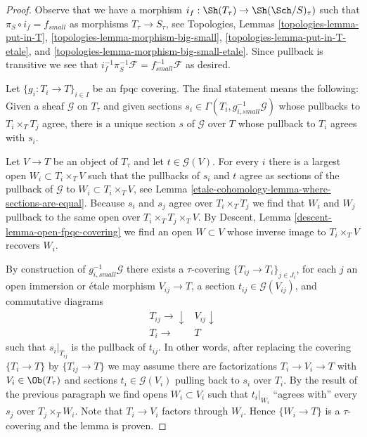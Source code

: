 \begin{proof}
Observe that we have a morphism $i_f : \Sh(T_\tau) \to \Sh(\Sch/S)_\tau)$
such that $\pi_S \circ i_f = f_{small}$ as morphisms
$T_\tau \to S_\tau$, see
Topologies, Lemmas \ref{topologies-lemma-put-in-T},
\ref{topologies-lemma-morphism-big-small},
\ref{topologies-lemma-put-in-T-etale}, and
\ref{topologies-lemma-morphism-big-small-etale}.
Since pullback is transitive we see that
$i_f^{-1} \pi_S^{-1}\mathcal{F} = f_{small}^{-1}\mathcal{F}$ as desired.

\medskip\noindent
Let $\{g_i : T_i \to T\}_{i \in I}$ be an fpqc covering.
The final statement means the following: Given a sheaf $\mathcal{G}$
on $T_\tau$ and given sections
$s_i \in \Gamma(T_i, g_{i, small}^{-1}\mathcal{G})$ whose pullbacks
to $T_i \times_T T_j$ agree, there is a unique section $s$ of $\mathcal{G}$
over $T$ whose pullback to $T_i$ agrees with $s_i$.

\medskip\noindent
Let $V \to T$ be an object of $T_\tau$ and let $t \in \mathcal{G}(V)$.
For every $i$ there is a largest open $W_i \subset T_i \times_T V$
such that the pullbacks of $s_i$ and $t$ agree as sections of the pullback
of $\mathcal{G}$ to $W_i \subset T_i \times_T V$, see
Lemma \ref{etale-cohomology-lemma-where-sections-are-equal}.
Because $s_i$ and $s_j$ agree over $T_i \times_T T_j$ we find
that $W_i$ and $W_j$ pullback to the same open over
$T_i \times_T T_j \times_T V$. By
Descent, Lemma \ref{descent-lemma-open-fpqc-covering}
we find an open $W \subset V$ whose inverse image to $T_i \times_T V$
recovers $W_i$.

\medskip\noindent
By construction of $g_{i, small}^{-1}\mathcal{G}$ there exists
a $\tau$-covering $\{T_{ij} \to T_i\}_{j \in J_i}$, for each $j$ an
open immersion or \'etale morphism $V_{ij} \to T$, a section
$t_{ij} \in \mathcal{G}(V_{ij})$, and commutative diagrams
$$
\begin{array}{cc}T_{ij} \longrightarrow\downarrow & V_{ij} \downarrow \\ T_i \longrightarrow & T\end{array}
$$
such that $s_i|_{T_{ij}}$ is the pullback of $t_{ij}$. In other words,
after replacing the covering $\{T_i \to T\}$ by $\{T_{ij} \to T\}$
we may assume there are factorizations $T_i \to V_i \to T$ with
$V_i \in \Ob(T_\tau)$ and sections $t_i \in \mathcal{G}(V_i)$
pulling back to $s_i$ over $T_i$.
By the result of the previous paragraph we find opens $W_i \subset V_i$
such that $t_i|_{W_i}$ ``agrees with'' every $s_j$ over $T_j \times_T W_i$.
Note that $T_i \to V_i$ factors through $W_i$.
Hence $\{W_i \to T\}$ is a $\tau$-covering and the lemma is proven.
\end{proof}

